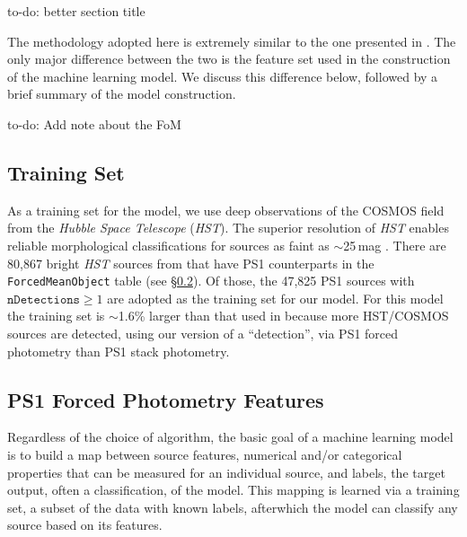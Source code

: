 \documentclass[twocolumn]{aastex63}
\newcommand{\todo}[1]{{\color{magenta} to-do: {#1}}}
\begin{document}
\todo{better section title}

The methodology adopted here is extremely similar to the one presented in
\citep{Tachibana18}. The only major difference between the two is the feature
set used in the construction of the machine learning model. We discuss this
difference below, followed by a brief summary of the model construction.

\todo{Add note about the FoM}

\subsection{Training Set}

As a training set for the model, we use deep observations of the COSMOS field
from the \textit{Hubble Space Telescope} (\textit{HST}). The superior
resolution of \textit{HST} enables reliable morphological classifications for
sources as faint as $\sim$25\,mag \citep{Leauthaud07}. There are 80,867 bright
\textit{HST} sources from \citet{Leauthaud07} that have PS1 counterparts
\citep[within a 1\arcsec match radius; see][]{Tachibana18} in the
\texttt{ForcedMeanObject} table (see \S\ref{sec:features}). Of those, the
47,825 PS1 sources with $\mathtt{nDetections} \ge 1$ are adopted as the
training set for our model. For this model the training set is $\sim$1.6\%
larger than that used in \citet{Tachibana18} because more HST/COSMOS sources
are detected, using our version of a ``detection'', via PS1 forced photometry
than PS1 stack photometry.

\subsection{PS1 Forced Photometry Features}\label{sec:features}

Regardless of the choice of algorithm, the basic goal of a machine learning
model is to build a map between source features, numerical and/or categorical
properties that can be measured for an individual source, and labels, the
target output, often a classification, of the model. This mapping is learned
via a training set, a subset of the data with known labels, afterwhich the
model can classify any source based on its features.
\end{document}
